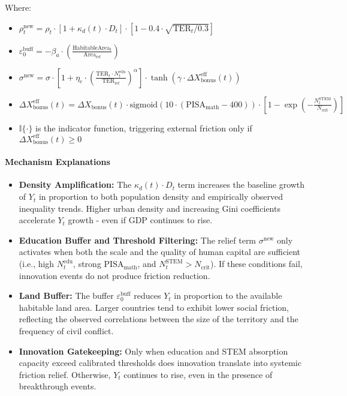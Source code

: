 \documentclass[12pt]{report}
\begin{document}
Where:
\begin{itemize}
  \item $\rho_t^{\text{new}} = \rho_t \cdot \left[1 + \kappa_d(t) \cdot D_t \right] \cdot \left[1 - 0.4 \cdot \sqrt{ \text{TER}_t / 0.3 } \right]$
  \item $\varepsilon_0^{\text{buff}} = -\beta_a \cdot \left( \frac{\text{HabitableArea}_t}{\text{Area}_{\text{ref}}} \right)$
  \item $\sigma^{\text{new}} = \sigma \cdot \left[1 + \eta_e \cdot \left( \frac{\text{TER}_t \cdot N_t^{\text{edu}}}{\text{TER}_{\text{ref}}} \right)^\alpha \right] \cdot \tanh\left( \gamma \cdot \Delta X_{\text{bonus}}^{\text{eff}}(t) \right)$
  \item $\Delta X_{\text{bonus}}^{\text{eff}}(t) = \Delta X_{\text{bonus}}(t) \cdot \text{sigmoid}(10 \cdot (\text{PISA}_{\text{math}} - 400)) \cdot \left[1 - \exp\left(-\frac{N_t^{\text{STEM}}}{N_{\text{crit}}} \right)\right]$
  \item $\mathbb{I}\{ \cdot \}$ is the indicator function, triggering external friction only if $ \Delta X_{\text{bonus}}^{\text{eff}}(t) \geq 0 $
\end{itemize}

\paragraph{Mechanism Explanations}
\begin{itemize}
  \item \textbf{Density Amplification:} The $\kappa_d(t) \cdot D_t$ term increases the baseline growth of $Y_t$ in proportion to both population density and empirically observed inequality trends. Higher urban density and increasing Gini coefficients accelerate $Y_t$ growth - even if GDP continues to rise.
  
  \item \textbf{Education Buffer and Threshold Filtering:} The relief term $\sigma^{\text{new}}$ only activates when both the scale and the quality of human capital are sufficient (i.e., high $N_t^{\text{edu}}$, strong $\text{PISA}_{\text{math}}$, and $N_t^{\text{STEM}} > N_{\text{crit}}$). If these conditions fail, innovation events do not produce friction reduction.

  \item \textbf{Land Buffer:} The buffer $\varepsilon_0^{\text{buff}}$ reduces $Y_t$ in proportion to the available habitable land area. Larger countries tend to exhibit lower social friction, reflecting the observed correlations between the size of the territory and the frequency of civil conflict.

  \item \textbf{Innovation Gatekeeping:} Only when education and STEM absorption capacity exceed calibrated thresholds does innovation translate into systemic friction relief. Otherwise, $Y_t$ continues to rise, even in the presence of breakthrough events.
\end{itemize}
\end{document}
